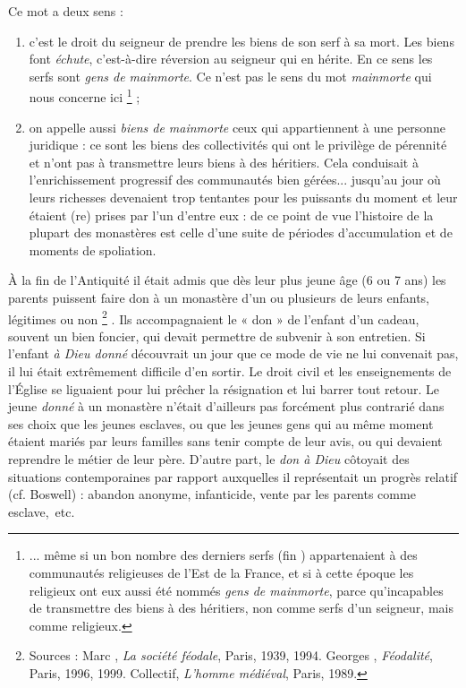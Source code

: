  Ce mot a deux sens :
\begin{enumerate}
\item c'est le droit du seigneur de prendre les biens de son serf à sa mort. Les biens font \emph{échute}, c'est-à-dire réversion au seigneur qui en hérite. En ce sens les serfs sont \emph{gens de mainmorte}. Ce n'est pas le sens du mot \emph{mainmorte} qui nous concerne ici%
\footnote{... même si un bon nombre des derniers serfs (fin ) appartenaient à des communautés religieuses de l'Est de la France, et si à cette époque les religieux ont eux aussi été nommés \emph{gens de mainmorte}, parce qu'incapables de transmettre des biens à des héritiers, non comme serfs d'un seigneur, mais comme religieux.}
 ;
\item on appelle aussi \emph{biens de mainmorte} ceux qui appartiennent à une personne juridique : ce sont les biens des collectivités qui ont le privilège de pérennité et n'ont pas à transmettre leurs biens à des héritiers. Cela conduisait à l'enrichissement progressif des communautés bien gérées... jusqu'au jour où leurs richesses devenaient trop tentantes pour les puissants du moment et leur étaient (re) prises par l'un d'entre eux : de ce point de vue l'histoire de la plupart des monastères est celle d'une suite de périodes d'accumulation et de moments de spoliation.
\end{enumerate} 

 À la fin de l'Antiquité il était admis que dès leur plus jeune âge (6 ou 7 ans) les parents puissent faire don à un monastère d'un ou plusieurs de leurs enfants, légitimes ou non%
\footnote{Sources : Marc , \emph{La société féodale}, Paris, 1939, 1994. Georges , \emph{Féodalité}, Paris, 1996, 1999. Collectif, \emph{L'homme médiéval}, Paris, 1989.}%
. Ils accompagnaient le « don » de l'enfant d'un cadeau, souvent un bien foncier, qui devait permettre de subvenir à son entretien. Si l'enfant \emph{à Dieu donné} découvrait un jour que ce mode de vie ne lui convenait pas, il lui était extrêmement difficile d'en sortir. Le droit civil et les enseignements de l'Église se liguaient pour lui prêcher la résignation et lui barrer tout retour. Le jeune \emph{donné} à un monastère n'était d'ailleurs pas forcément plus contrarié dans ses choix que les jeunes esclaves, ou que les jeunes gens qui au même moment étaient mariés par leurs familles sans tenir compte de leur avis, ou qui devaient reprendre le métier de leur père. D'autre part, le \emph{don à Dieu} côtoyait des situations contemporaines par rapport auxquelles il représentait un progrès relatif (cf. {Boswell}) : abandon anonyme, infanticide, vente par les parents comme esclave,~etc. 


